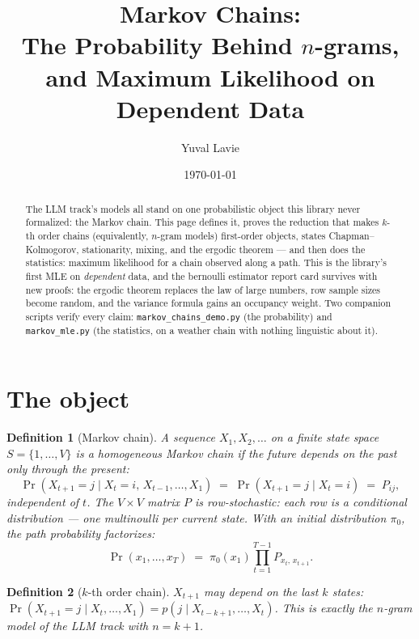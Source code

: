 \documentclass[11pt]{article}
\title{Markov Chains:\\
The Probability Behind $n$-grams, and Maximum Likelihood on
Dependent Data}
\author{Yuval Lavie}
\date{\today}
\newtheorem{definition}{Definition}
\begin{document}
\maketitle

\begin{abstract}
The LLM track's models all stand on one probabilistic object this
library never formalized: the Markov chain. This page defines it,
proves the reduction that makes $k$-th order chains (equivalently,
$n$-gram models) first-order objects, states Chapman--Kolmogorov,
stationarity, mixing, and the ergodic theorem --- and then does the
statistics: maximum likelihood for a chain observed along a path.
This is the library's first MLE on \emph{dependent} data, and the
bernoulli estimator report card survives with new proofs: the ergodic
theorem replaces the law of large numbers, row sample sizes become
random, and the variance formula gains an occupancy weight. Two
companion scripts verify every claim:
\texttt{markov\_chains\_demo.py} (the probability) and
\texttt{markov\_mle.py} (the statistics, on a weather chain with
nothing linguistic about it).
\end{abstract}

\section{The object}

\begin{definition}[Markov chain]
A sequence $X_1, X_2, \dots$ on a finite state space
$S = \{1,\dots,V\}$ is a \emph{homogeneous Markov chain} if the future
depends on the past only through the present:
\begin{equation}
  \Pr(X_{t+1} = j \mid X_t = i,\, X_{t-1}, \dots, X_1)
  \;=\; \Pr(X_{t+1} = j \mid X_t = i) \;=\; P_{ij},
  \label{eq:markovprop}
\end{equation}
independent of $t$. The $V \times V$ matrix $P$ is row-stochastic:
each row is a conditional distribution --- \emph{one multinoulli per
current state}. With an initial distribution $\pi_0$, the path
probability factorizes:
\begin{equation}
  \Pr(x_1, \dots, x_T)
  \;=\; \pi_0(x_1) \prod_{t=1}^{T-1} P_{x_t,\, x_{t+1}}.
  \label{eq:path}
\end{equation}
\end{definition}

\begin{definition}[$k$-th order chain]
$X_{t+1}$ may depend on the last $k$ states:
$\Pr(X_{t+1} = j \mid X_t, \dots, X_1) =
p(j \mid X_{t-k+1}, \dots, X_t)$. This is exactly the $n$-gram model
of the LLM track with $n = k + 1$.
\end{definition}
\end{document}

